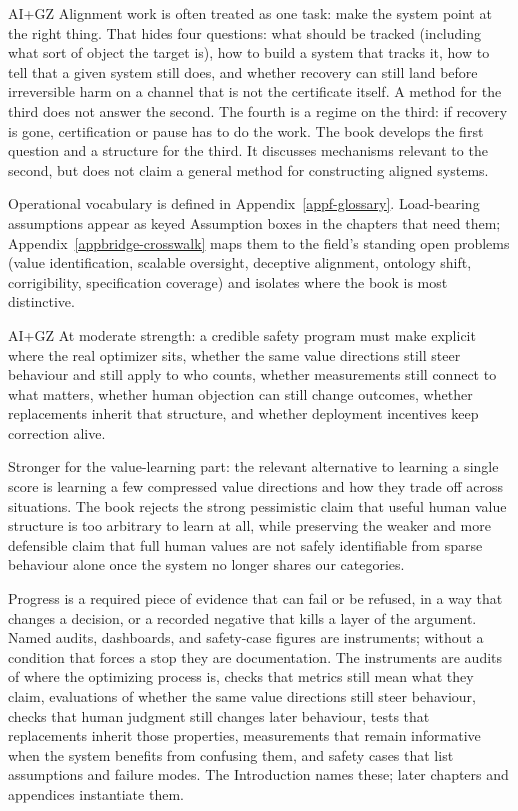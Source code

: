 \begin{authbar}{AI+GZ}
Alignment work is often treated as one task: make the system point at the right thing.
That hides four questions: what should be tracked (including what sort of object the target is), how to build a system that tracks it, how to tell that a given system still does, and whether recovery can still land before irreversible harm on a channel that is not the certificate itself.
A method for the third does not answer the second.
The fourth is a regime on the third: if recovery is gone, certification or pause has to do the work.
The book develops the first question and a structure for the third.
It discusses mechanisms relevant to the second, but does not claim a general method for constructing aligned systems.

Operational vocabulary is defined in Appendix~\ref{appf-glossary}.
Load-bearing assumptions appear as keyed Assumption boxes in the chapters that need them; Appendix~\ref{appbridge-crosswalk} maps them to the field's standing open problems (value identification, scalable oversight, deceptive alignment, ontology shift, corrigibility, specification coverage) and isolates where the book is most distinctive.
\end{authbar}


\begin{authbar}{AI+GZ}
At moderate strength: a credible safety program must make explicit where the real optimizer sits, whether the same value directions still steer behaviour and still apply to who counts, whether measurements still connect to what matters, whether human objection can still change outcomes, whether replacements inherit that structure, and whether deployment incentives keep correction alive.

Stronger for the value-learning part: the relevant alternative to learning a single score is learning a few compressed value directions and how they trade off across situations.
The book rejects the strong pessimistic claim that useful human value structure is too arbitrary to learn at all, while preserving the weaker and more defensible claim that full human values are not safely identifiable from sparse behaviour alone once the system no longer shares our categories.

Progress is a required piece of evidence that can fail or be refused, in a way that changes a decision, or a recorded negative that kills a layer of the argument.
Named audits, dashboards, and safety-case figures are instruments; without a condition that forces a stop they are documentation.
The instruments are audits of where the optimizing process is, checks that metrics still mean what they claim, evaluations of whether the same value directions still steer behaviour, checks that human judgment still changes later behaviour, tests that replacements inherit those properties, measurements that remain informative when the system benefits from confusing them, and safety cases that list assumptions and failure modes.
The Introduction names these; later chapters and appendices instantiate them.
\end{authbar}

